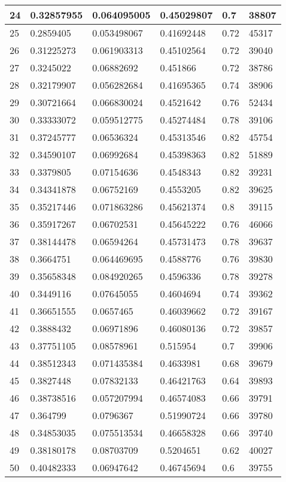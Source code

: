 \begin{longtable}{|l|l|l|l|l|l|}
24 & 0.32857955 & 0.064095005 & 0.45029807 & 0.7 & 38807 \\ \hline 
25 & 0.2859405 & 0.053498067 & 0.41692448 & 0.72 & 45317 \\ \hline 
26 & 0.31225273 & 0.061903313 & 0.45102564 & 0.72 & 39040 \\ \hline 
27 & 0.3245022 & 0.06882692 & 0.451866 & 0.72 & 38786 \\ \hline 
28 & 0.32179907 & 0.056282684 & 0.41695365 & 0.74 & 38906 \\ \hline 
29 & 0.30721664 & 0.066830024 & 0.4521642 & 0.76 & 52434 \\ \hline 
30 & 0.33333072 & 0.059512775 & 0.45274484 & 0.78 & 39106 \\ \hline 
31 & 0.37245777 & 0.06536324 & 0.45313546 & 0.82 & 45754 \\ \hline 
32 & 0.34590107 & 0.06992684 & 0.45398363 & 0.82 & 51889 \\ \hline 
33 & 0.3379805 & 0.07154636 & 0.4548343 & 0.82 & 39231 \\ \hline 
34 & 0.34341878 & 0.06752169 & 0.4553205 & 0.82 & 39625 \\ \hline 
35 & 0.35217446 & 0.071863286 & 0.45621374 & 0.8 & 39115 \\ \hline 
36 & 0.35917267 & 0.06702531 & 0.45645222 & 0.76 & 46066 \\ \hline 
37 & 0.38144478 & 0.06594264 & 0.45731473 & 0.78 & 39637 \\ \hline 
38 & 0.3664751 & 0.064469695 & 0.4588776 & 0.76 & 39830 \\ \hline 
39 & 0.35658348 & 0.084920265 & 0.4596336 & 0.78 & 39278 \\ \hline 
40 & 0.3449116 & 0.07645055 & 0.4604694 & 0.74 & 39362 \\ \hline 
41 & 0.36651555 & 0.0657465 & 0.46039662 & 0.72 & 39167 \\ \hline 
42 & 0.3888432 & 0.06971896 & 0.46080136 & 0.72 & 39857 \\ \hline 
43 & 0.37751105 & 0.08578961 & 0.515954 & 0.7 & 39906 \\ \hline 
44 & 0.38512343 & 0.071435384 & 0.4633981 & 0.68 & 39679 \\ \hline 
45 & 0.3827448 & 0.07832133 & 0.46421763 & 0.64 & 39893 \\ \hline 
46 & 0.38738516 & 0.057207994 & 0.46574083 & 0.66 & 39791 \\ \hline 
47 & 0.364799 & 0.0796367 & 0.51990724 & 0.66 & 39780 \\ \hline 
48 & 0.34853035 & 0.075513534 & 0.46658328 & 0.66 & 39740 \\ \hline 
49 & 0.38180178 & 0.08703709 & 0.5204651 & 0.62 & 40027 \\ \hline 
50 & 0.40482333 & 0.06947642 & 0.46745694 & 0.6 & 39755 \\ \hline 
\end{longtable}